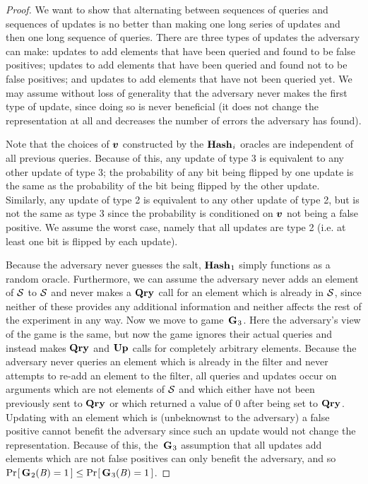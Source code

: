 \begin{proof}
We want to show that alternating between sequences of queries and sequences of updates is no better than making one long series of updates and then one long sequence of queries. There are three types of updates the adversary can make: updates to add elements that have been queried and found to be false positives; updates to add elements that have been queried and found not to be false positives; and updates to add elements that have not been queried yet. We may assume without loss of generality that the adversary never makes the first type of update, since doing so is never beneficial (it does not change the representation at all and decreases the number of errors the adversary has found).

Note that the choices of $\vv$ constructed by the $\mathbf{Hash}\hspace{0.5pt}_i$ oracles are independent of all previous queries. Because of this, any update of type 3 is equivalent to any other update of type 3; the probability of any bit being flipped by one update is the same as the probability of the bit being flipped by the other update. Similarly, any update of type 2 is equivalent to any other update of type 2, but is not the same as type 3 since the probability is conditioned on $\vv$ not being a false positive. We assume the worst case, namely that all updates are type 2 (i.e. at least one bit is flipped by each update).

Because the adversary never guesses the salt, $\mathbf{Hash}\hspace{0.5pt}_1$ simply functions as a random oracle. Furthermore, we can assume the adversary never adds an element of $\mathcal{S}$ to $\mathcal{S}$ and never makes a $\mathbf{Qry}\hspace{0.5pt}$ call for an element which is already in $\mathcal{S}$, since neither of these provides any additional information and neither affects the rest of the experiment in any way. Now we move to game~$\mathbf{G}\hspace{0.5pt}_3$. Here the adversary's view of the game is the same, but now the game ignores their actual queries and instead makes $\mathbf{Qry}\hspace{0.5pt}$ and $\mathbf{Up}\hspace{0.5pt}$ calls for completely arbitrary elements. Because the adversary never queries an element which is already in the filter and never attempts to re-add an element to the filter, all queries and updates occur on arguments which are not elements of $\mathcal{S}$ and which either have not been previously sent to $\mathbf{Qry}\hspace{0.5pt}$ or which returned a value of 0 after being set to $\mathbf{Qry}\hspace{0.5pt}$. Updating with an element which is (unbeknownst to the adversary) a false positive cannot benefit the adversary since such an update would not change the representation. Because of this, the~$\mathbf{G}\hspace{0.5pt}_3$ assumption that all updates add elements which are not false positives can only benefit the adversary, and so $\Pr\hspace{-1pt}\left[\,\mathbf{G}\hspace{0.5pt}_2(\mathit{B}) = 1\,\right] \le \Pr\hspace{-1pt}\left[\,\mathbf{G}\hspace{0.5pt}_3(\mathit{B}) = 1\,\right]$.


\end{proof}
